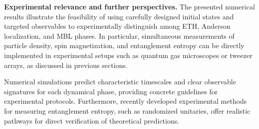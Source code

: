 

\textbf{Experimental relevance and further perspectives.}
The presented numerical results illustrate the feasibility of using carefully designed initial states and targeted observables to experimentally distinguish among ETH, Anderson localization, and MBL phases. In particular, simultaneous measurements of particle density, spin magnetization, and entanglement entropy can be directly implemented in experimental setups such as quantum gas microscopes or tweezer arrays, as discussed in previous sections.

Numerical simulations predict characteristic timescales and clear observable signatures for each dynamical phase, providing concrete guidelines for experimental protocols. Furthermore, recently developed experimental methods for measuring entanglement entropy, such as randomized unitaries, offer realistic pathways for direct verification of theoretical predictions.







